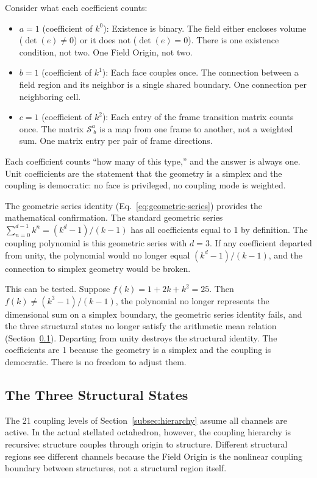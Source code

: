 \documentclass[aps,prd,preprint,superscriptaddress,showpacs,preprintnumbers,amsmath,amssymb,nofootinbib]{revtex4-2}
\begin{document}
Consider what each coefficient counts:
\begin{itemize}
\item $a = 1$ (coefficient of $k^0$): Existence is binary. The field either encloses volume ($\det(e) \neq 0$) or it does not ($\det(e) = 0$). There is one existence condition, not two. One Field Origin, not two.
\item $b = 1$ (coefficient of $k^1$): Each face couples once. The connection between a field region and its neighbor is a single shared boundary. One connection per neighboring cell.
\item $c = 1$ (coefficient of $k^2$): Each entry of the frame transition matrix counts once. The matrix $\mathcal{S}^a_{\;b}$ is a map from one frame to another, not a weighted sum. One matrix entry per pair of frame directions.
\end{itemize}

Each coefficient counts ``how many of this type,'' and the answer is always one. Unit coefficients are the statement that the geometry is a simplex and the coupling is democratic: no face is privileged, no coupling mode is weighted.

The geometric series identity (Eq.~\ref{eq:geometric-series}) provides the mathematical confirmation. The standard geometric series $\sum_{n=0}^{d-1} k^n = (k^d - 1)/(k - 1)$ has all coefficients equal to 1 by definition. The coupling polynomial is this geometric series with $d = 3$. If any coefficient departed from unity, the polynomial would no longer equal $(k^d - 1)/(k - 1)$, and the connection to simplex geometry would be broken.

This can be tested. Suppose $f(k) = 1 + 2k + k^2 = 25$. Then $f(k) \neq (k^3 - 1)/(k - 1)$, the polynomial no longer represents the dimensional sum on a simplex boundary, the geometric series identity fails, and the three structural states no longer satisfy the arithmetic mean relation (Section~\ref{subsec:states}). Departing from unity destroys the structural identity. The coefficients are 1 because the geometry is a simplex and the coupling is democratic. There is no freedom to adjust them.

\subsection{The Three Structural States}
\label{subsec:states}

The 21 coupling levels of Section~\ref{subsec:hierarchy} assume all channels are active. In the actual stellated octahedron, however, the coupling hierarchy is recursive: structure couples through origin to structure. Different structural regions see different channels because the Field Origin is the nonlinear coupling boundary between structures, not a structural region itself.
\end{document}

